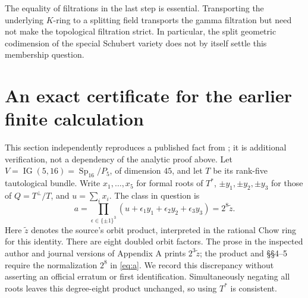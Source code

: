 \documentclass[11pt]{article}
\newcommand{\IG}{\operatorname{IG}}
\begin{document}
The equality of filtrations in the last step is essential. Transporting
the underlying $K$-ring to a splitting field transports the gamma
filtration but need not make the topological filtration strict. In
particular, the split geometric codimension of the special Schubert
variety does not by itself settle this membership question.

\section{An exact certificate for the earlier finite calculation}

This section independently reproduces a published fact from
\cite[Appendix A]{oddspin}; it is additional verification, not a
dependency of the analytic proof above. Let
$V=\IG(5,16)=\operatorname{Sp}_{16}/P_5$, of dimension $45$,
and let $T$ be its rank-five tautological bundle. Write $x_1,\ldots,x_5$
for formal roots of $T^*$, $\pm y_1,\pm y_2,\pm y_3$ for those of
$Q=T^\perp/T$, and $u=\sum_i x_i$. The class in question is
\begin{equation}\label{eq:a}
 a=\prod_{\epsilon\in\{\pm1\}^3}
             (u+\epsilon_1y_1+\epsilon_2y_2+\epsilon_3y_3)
                 =2^8\widetilde z.
\end{equation}
Here $\widetilde z$ denotes the source's orbit product, interpreted in
the rational Chow ring for this identity. There are eight doubled orbit
factors. The prose in the inspected
author and journal versions of Appendix A prints $2^3\widetilde z$;
the product and \S\S4--5 require the normalization $2^8$ in
\eqref{eq:a}. We record this discrepancy without asserting an official
erratum or first identification. Simultaneously negating all roots
leaves this degree-eight product unchanged, so using $T^*$ is consistent.
\end{document}
